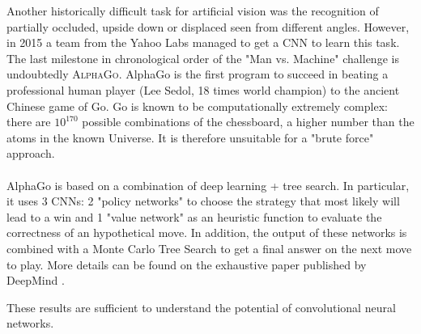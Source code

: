 Another historically difficult task for artificial vision was the recognition of partially occluded, upside down or displaced seen from different angles. However, in 2015 a team from the Yahoo Labs managed to get a CNN \parencite{WMit} to learn this task. \\The last milestone in chronological order of the "Man vs. Machine" challenge is undoubtedly \textsc{AlphaGo}\parencite{WAlphaGo}. AlphaGo is the first program to succeed in beating a professional human player (Lee Sedol, 18 times world champion) to the ancient Chinese game of Go. Go is known to be computationally extremely complex: there are $10^{170}$ possible combinations of the chessboard, a higher number than the atoms in the known Universe.
It is therefore unsuitable for a "brute force" approach.
\\
\\
AlphaGo is based on a combination of deep learning + tree search. In particular, it uses 3 CNNs: 2 "policy networks" to choose the strategy that most likely will lead to a win and 1 "value network" as an heuristic function to evaluate the correctness of an hypothetical move. In addition, the output of these networks is combined with a Monte Carlo Tree Search to get a final answer on the next move to play. More details can be found on the exhaustive paper published by DeepMind \parencite{AlphaGo}.

These results are sufficient to understand the potential of convolutional neural networks.